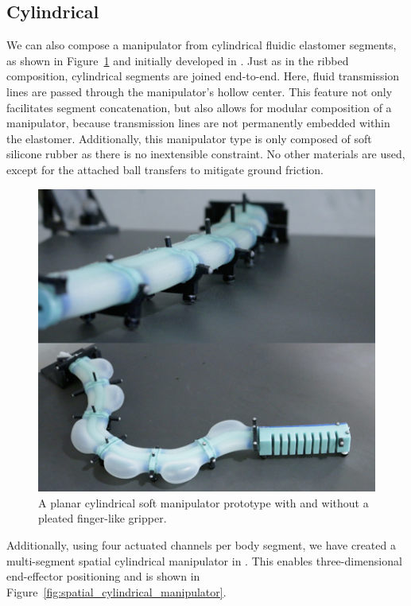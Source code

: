 \subsection{Cylindrical}
\label{subsec:Manipulators, Cylindrical}
We can also compose a manipulator from cylindrical fluidic elastomer segments, as shown in Figure~\ref{fig:cylindrical_manipulator} and initially developed in \citet{marchese2014whole}.
Just as in the ribbed composition, cylindrical segments are joined end-to-end.
Here, fluid transmission lines are passed through the manipulator's hollow center.
This feature not only facilitates segment concatenation, but also allows for modular composition of a manipulator, because transmission lines are not permanently embedded within the elastomer.
Additionally, this manipulator type is only composed of soft silicone rubber as there is no inextensible constraint.
No other materials are used, except for the attached ball transfers to mitigate ground friction.
\begin{figure}[htb]
\centering
\includegraphics[width=\columnwidth]{Figures/manipulators/cylindrical_manipulator_real}
\caption[A cylindrical planar soft manipulator prototype.]{A planar cylindrical soft manipulator prototype with and without a pleated finger-like gripper.} \label{fig:cylindrical_manipulator}
\end{figure}

Additionally, using four actuated channels per body segment, we have created a multi-segment spatial cylindrical manipulator in \citet{marchese2015design}. This enables three-dimensional end-effector positioning and is shown in Figure~\ref{fig:spatial_cylindrical_manipulator}.

